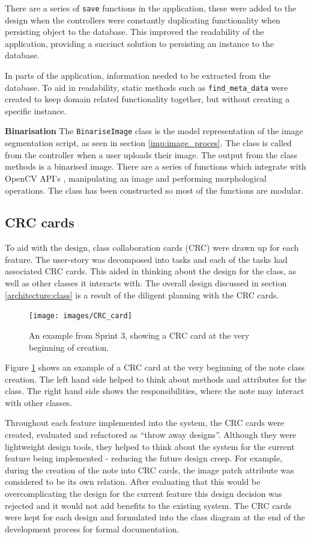 There are a series of \texttt{save} functions in the application, these were added to the design when the controllers were constantly duplicating functionality when persisting object to the database. This improved the readability of the application, providing a succinct solution to persisting an instance to the database.

In parts of the application, information needed to be extracted from the database. To aid in readability, static methods such as \texttt{find\_meta\_data} were created to keep domain related functionality together, but without creating a specific instance.

\noindent
\textbf{Binarisation}
\newline
The \texttt{BinariseImage} class is the model representation of the image segmentation script, as seen in section \ref{imp:image_proces}. The class is called from the controller when a user uploads their image. The output from the class methods is a binarised image. There are a series of functions which integrate with OpenCV API's \cite{citeulike:13206865}, manipulating an image and performing morphological operations. The class has been constructed so most of the functions are modular.

\subsection{CRC cards}
To aid with the design, class collaboration cards (CRC) were drawn up for each feature. The user-story was decomposed into tasks and each of the tasks had associated CRC cards. This aided in thinking about the design for the class, as well as other classes it interacts with.  The overall design discussed in section \ref{architecture:class} is a result of the diligent planning with the CRC cards.

\begin{figure}[H]
  \centering
  \texttt{[image: images/CRC\_card]}
  \caption{An example from Sprint 3, showing a CRC card at the very beginning of creation.}
  \label{fig:crc1}
\end{figure}

Figure \ref{fig:crc1} shows an example of a CRC card at the very beginning of the note class creation. The left hand side helped to think about methods and attributes for the class. The right hand side shows the responsibilities, where the note may interact with other classes.

Throughout each feature implemented into the system, the CRC cards were created, evaluated and refactored as ``throw away designs''. Although they were lightweight design tools, they helped to think about the system for the current feature being implemented - reducing the future design creep. For example, during the creation of the note into CRC cards, the image patch attribute was considered to be its own relation. After evaluating that this would be overcomplicating the design for the current feature this design decision was rejected and it would not add benefits to the existing system. The CRC cards were kept for each design and formulated into the class diagram at the end of the development process for formal documentation.

